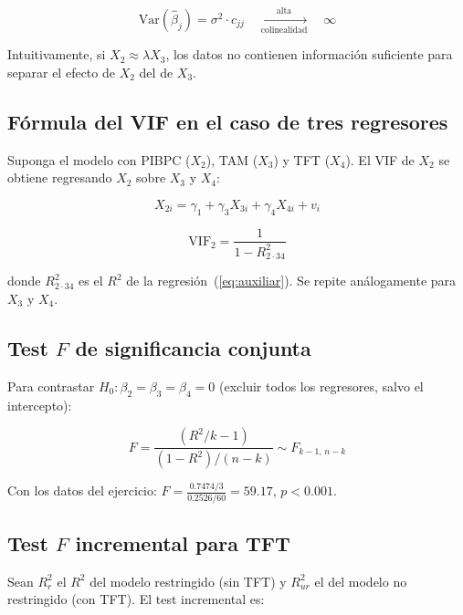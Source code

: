 \documentclass[12pt, letterpaper]{article}
\begin{document}
\begin{equation}
  \text{Var}(\hat{\beta}_j)
    = \sigma^2 \cdot c_{jj}
    \quad \xrightarrow[\text{colinealidad}]{\text{alta}} \quad \infty
  \label{eq:inflacion}
\end{equation}

\noindent Intuitivamente, si $X_2 \approx \lambda X_3$, los datos no contienen
información suficiente para separar el efecto de $X_2$ del de $X_3$.

\subsection{Fórmula del VIF en el caso de tres regresores}

Suponga el modelo con PIBPC ($X_2$), TAM ($X_3$) y TFT ($X_4$). El VIF de $X_2$
se obtiene regresando $X_2$ sobre $X_3$ y $X_4$:

\begin{equation}
  X_{2i} = \gamma_1 + \gamma_3 X_{3i} + \gamma_4 X_{4i} + v_i
  \label{eq:auxiliar}
\end{equation}

\begin{equation}
  \text{VIF}_2 = \frac{1}{1 - R_{2\cdot 34}^2}
  \label{eq:VIF2}
\end{equation}

\noindent donde $R_{2\cdot 34}^2$ es el $R^2$ de la regresión~(\ref{eq:auxiliar}).
Se repite análogamente para $X_3$ y $X_4$.

\subsection{Test $F$ de significancia conjunta}

Para contrastar $H_0\!: \beta_2 = \beta_3 = \beta_4 = 0$ (excluir todos los
regresores, salvo el intercepto):

\begin{equation}
  F = \frac{(R^2/k-1)}{(1-R^2)/(n-k)}
    \sim F_{k-1,\, n-k}
  \label{eq:F_global}
\end{equation}

\noindent Con los datos del ejercicio:
$F = \frac{0.7474/3}{0.2526/60} = 59.17$, $p < 0.001$.

\subsection{Test $F$ incremental para TFT}

Sean $R_r^2$ el $R^2$ del modelo restringido (sin TFT) y $R_{ur}^2$ el del
modelo no restringido (con TFT). El test incremental es:
\end{document}
